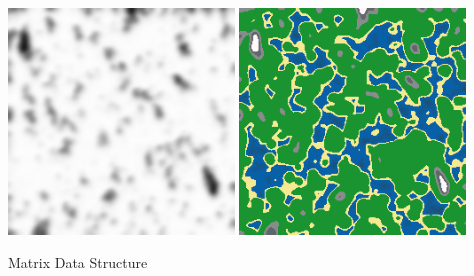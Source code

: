 \begin{flushleft}
\begin{enumerate}
            \begin{center}
                \includegraphics[width=6cm]{Images/Prototype/Seed420 Grayscale.png}
                \includegraphics[width=6cm]{Images/Prototype/Seed420 Colour.png} 
            \end{center}
            
            \vspace{1cm}
            {\Large Matrix Data Structure} \\
            \vspace{0.25cm}


\end{enumerate}
\end{flushleft}
